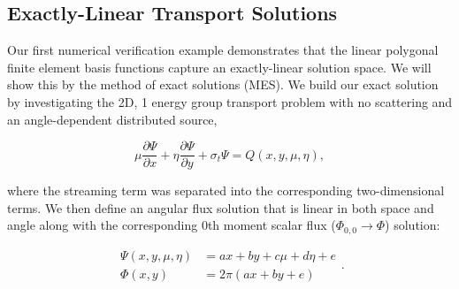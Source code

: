 \documentclass[preprint,10pt]{elsarticle}
\begin{document}
\subsection{Exactly-Linear Transport Solutions}

Our first numerical verification example demonstrates that the linear polygonal finite element basis functions capture an exactly-linear solution space. We will show this by the method of exact solutions (MES). We build our exact solution by investigating the 2D, 1 energy group transport problem with no scattering and an angle-dependent distributed source,

\begin{equation}
\label{eq::Results_Linear_angflux}
\mu \frac{\partial \Psi}{\partial x} + \eta \frac{\partial \Psi}{\partial y} + \sigma_t \Psi = Q(x,y, \mu, \eta), 
\end{equation}

\noindent where the streaming term was separated into the corresponding two-dimensional terms. We then define an angular flux solution that is linear in both space and angle along with the corresponding 0th moment scalar flux ($\Phi_{0,0} \rightarrow \Phi$) solution:

\begin{equation}
\label{eq::BF_Results_Linear_fluxsols}
\begin{aligned}
\Psi (x,y,\mu,\eta) &= ax + by + c \mu + d\eta + e\\
\Phi (x,y) &= 2 \pi \left( ax + by  + e \right)
\end{aligned} .
\end{equation}
\end{document}
